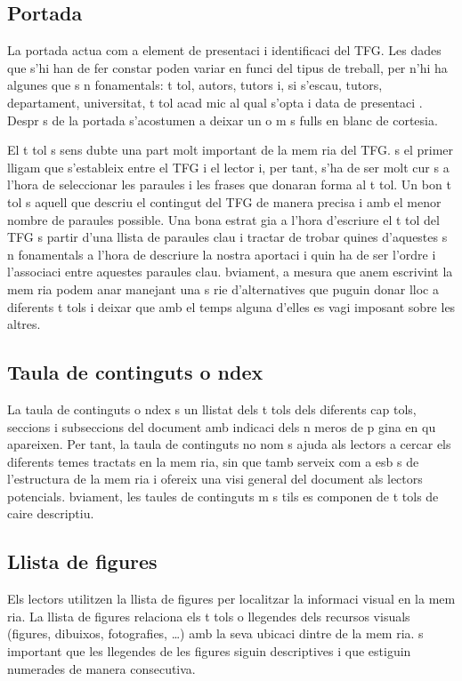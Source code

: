 \subsection{Portada}

La portada actua com a element de presentaci  i identificaci  del TFG. Les dades que s'hi han de fer constar poden variar en funci  del tipus de treball, per  n'hi ha algunes que s n fonamentals: t tol, autors, tutors i, si s'escau, tutors, departament, universitat, t tol acad mic al qual s'opta i data de presentaci . Despr s de la portada s'acostumen a deixar un o m s fulls en blanc de cortesia.

El t tol  s sens dubte una part molt important de la mem ria del TFG.  s el primer lligam que s'estableix entre el TFG i el lector i, per tant, s'ha de ser molt cur s a l'hora de seleccionar les paraules i les frases que donaran forma al t tol. Un bon t tol  s aquell que descriu el contingut del TFG de manera precisa i amb el menor nombre de paraules possible. Una bona estrat gia a l'hora d'escriure el t tol del TFG  s partir d'una llista de paraules clau i tractar de trobar quines d'aquestes s n fonamentals a l'hora de descriure la nostra aportaci  i quin ha de ser l'ordre i l'associaci  entre aquestes paraules clau.  bviament, a mesura que anem escrivint la mem ria podem anar manejant una s rie d'alternatives que puguin donar lloc a diferents t tols i deixar que amb el temps alguna d'elles es vagi imposant sobre les altres.

\subsection{Taula de continguts o  ndex}

La taula de continguts o  ndex  s un llistat dels t tols dels diferents cap tols, seccions i subseccions del document amb indicaci  dels n meros de p gina en qu  apareixen. Per tant, la taula de continguts no nom s ajuda als lectors a cercar els diferents temes tractats en la mem ria, sin  que tamb  serveix com a esb s de l'estructura de la mem ria i ofereix una visi  general del document als lectors potencials.  bviament, les taules de continguts m s  tils es componen de t tols de caire descriptiu.

\subsection{Llista de figures}

Els lectors utilitzen la llista de figures per localitzar la informaci  visual en la mem ria. La llista de figures relaciona els t tols o llegendes dels recursos visuals (figures, dibuixos, fotografies, \ldots) amb la seva ubicaci  dintre de la mem ria.  s important que les llegendes de les figures siguin descriptives i que estiguin numerades de manera consecutiva.

